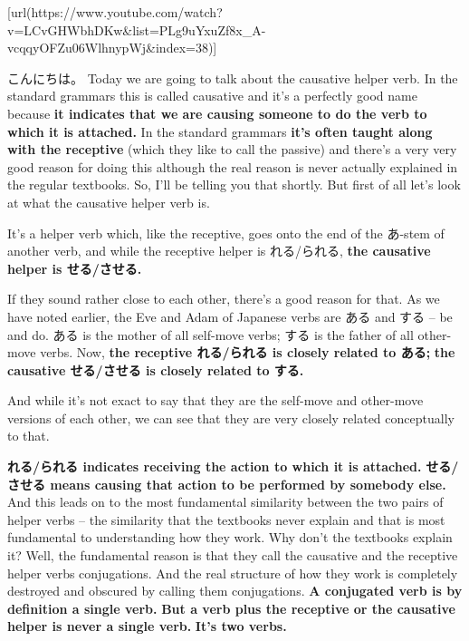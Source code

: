 \startsectionlevel[title={{\bf 19. Causative + causative receptive}},reference={causative-causative-receptive}]

[url(https://www.youtube.com/watch?v=LCvGHWbhDKw&list=PLg9uYxuZf8x_A-vcqqyOFZu06WlhnypWj&index=38)]

こんにちは。\crlf
Today we are going to talk about the causative helper verb. In the standard grammars this is called causative and it's a perfectly good name because {\bf it indicates that we are causing someone to do the verb to which it is attached.} In the standard grammars {\bf it's often taught along with the receptive} (which they like to call the passive) and there's a very very good reason for doing this although the real reason is never actually explained in the regular textbooks. So, I'll be telling you that shortly. But first of all let's look at what the causative helper verb is.

It's a helper verb which, like the receptive, goes onto the end of the あ-stem of another verb, and while the receptive helper is れる/られる, {\bf the causative helper is せる/させる.}

{}

If they sound rather close to each other, there's a good reason for that. As we have noted earlier, the Eve and Adam of Japanese verbs are ある and する -- be and do. ある is the mother of all self-move verbs; する is the father of all other-move verbs. Now, {\bf the receptive れる/られる is closely related to ある;} {\bf the causative せる/させる is closely related to する.}

{}

And while it's not exact to say that they are the self-move and other-move versions of each other, we can see that they are very closely related conceptually to that.

\thinrule

{\bf れる/られる indicates receiving the action to which it is attached.} {\bf せる/させる means causing that action to be performed by somebody else.} And this leads on to the most fundamental similarity between the two pairs of helper verbs -- the similarity that the textbooks never explain and that is most fundamental to understanding how they work. Why don't the textbooks explain it? Well, the fundamental reason is that they call the causative and the receptive helper verbs conjugations. And the real structure of how they work is completely destroyed and obscured by calling them conjugations. {\bf A conjugated verb is by definition a single verb.} {\bf But a verb plus the receptive or the causative helper is never a single verb.} {\bf It's two verbs.}

